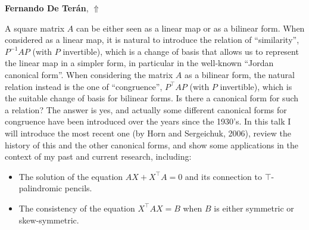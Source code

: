 \documentclass[ILAS2025-program.tex]{subfiles}
\begin{document}
\hypertarget{down0003}{}\begin{ilasabstract}
    
\textbf{Fernando De Terán},  \hfill \hyperlink{up0003}{$\Uparrow$}
    
    
\mtskip
    A square matrix $A$ can be either seen as a linear map or as a bilinear form. When considered as a linear map, it is natural to introduce the relation of ``similarity'', $P^{-1}AP$ (with $P$ invertible), which is a change of basis that allows us to represent the linear map in a simpler form, in particular in the well-known ``Jordan canonical form''. When considering the matrix $A$ as a bilinear form, the natural relation instead is the one of ``congruence'', $P^\top AP$ (with $P$ invertible), which is the suitable change of basis for bilinear forms. Is there a canonical form for such a relation? The answer is yes, and actually some different canonical forms for congruence have been introduced over the years since the 1930's. In this talk I will introduce the most recent one (by Horn and Sergeichuk, 2006), review the history of this and the other canonical forms, and show some applications in the context of my past and current research, including:
\begin{itemize}
    \item The solution of the equation $AX+X^\top A=0$ and its connection to $\top$-palindromic pencils.
    \item The consistency of the equation $X^\top AX=B$ when $B$ is either symmetric or skew-symmetric.
\end{itemize}
\end{ilasabstract}
    
\end{document}
